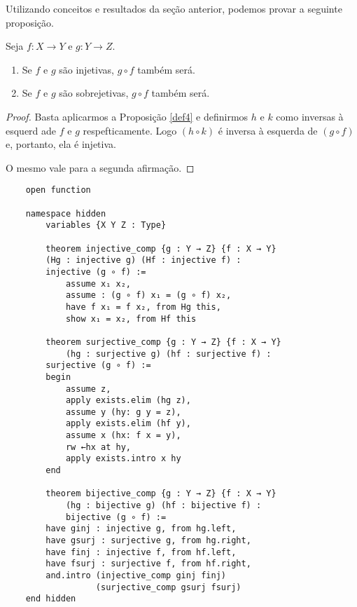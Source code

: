 Utilizando conceitos e resultados da seção anterior, podemos provar a seguinte proposição.

\begin{theorem}
    Seja $f: X \to Y$ e $g: Y \to Z$. 
    \renewcommand{\labelenumi}{\Roman{enumi}}
    \begin{enumerate}
        \item Se $f$ e $g$ são injetivas, $g \circ f$ também será.
        \item Se $f$ e $g$ são sobrejetivas, $g \circ f$ também será.
    \end{enumerate}
\end{theorem}

\begin{proof}
    Basta aplicarmos a Proposição \ref{def4} e definirmos $h$ e $k$ como 
    inversas à esquerd ade $f$ e $g$ respefticamente. Logo $(h \circ k)$ 
    é inversa à esquerda de  $(g \circ f)$ e, portanto, ela é injetiva. 

    O mesmo vale para a segunda afirmação.
\end{proof} 

\begin{lstlisting}
    open function

    namespace hidden
        variables {X Y Z : Type}

        theorem injective_comp {g : Y → Z} {f : X → Y}
        (Hg : injective g) (Hf : injective f) :
        injective (g ∘ f) :=
            assume x₁ x₂,
            assume : (g ∘ f) x₁ = (g ∘ f) x₂,
            have f x₁ = f x₂, from Hg this,
            show x₁ = x₂, from Hf this

        theorem surjective_comp {g : Y → Z} {f : X → Y}
            (hg : surjective g) (hf : surjective f) :
        surjective (g ∘ f) :=
        begin
            assume z, 
            apply exists.elim (hg z),
            assume y (hy: g y = z),
            apply exists.elim (hf y),
            assume x (hx: f x = y),
            rw ←hx at hy,
            apply exists.intro x hy
        end

        theorem bijective_comp {g : Y → Z} {f : X → Y}
            (hg : bijective g) (hf : bijective f) : 
            bijective (g ∘ f) :=
        have ginj : injective g, from hg.left,
        have gsurj : surjective g, from hg.right, 
        have finj : injective f, from hf.left,
        have fsurj : surjective f, from hf.right,
        and.intro (injective_comp ginj finj) 
                  (surjective_comp gsurj fsurj)
    end hidden       
\end{lstlisting}

